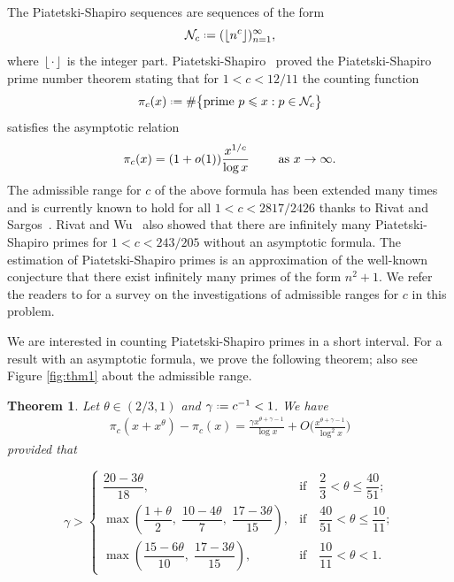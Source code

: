 \documentclass[12pt, reqno, twoside, letterpaper]{amsart}
\numberwithin{equation}{section}
\def\fl#1{\left\lfloor#1\right\rfloor}
\newcommand{\cN}{\ensuremath{\mathcal{N}}}
\theoremstyle{customthm}
\newtheorem{theorem}[X]{Theorem}
\theoremstyle{customrem}
\renewcommand{\le}{\ensuremath{\leqslant}}
\def\fl#1{\left\lfloor#1\right\rfloor}
\newcommand*{\defeq}{\mathrel{\vcenter{\baselineskip0.5ex \lineskiplimit0pt
			\hbox{\scriptsize.}\hbox{\scriptsize.}}}%
	=}
\begin{document}
The Piatetski-Shapiro sequences are sequences of the form
$$
\cN_c \defeq (\lfloor n^{c} \rfloor)_{n=1}^\infty,
$$
where $\fl{\cdot}$ is the integer part. Piatetski-Shapiro~\cite{PS} proved the Piatetski-Shapiro prime number theorem stating that for $ 1 < c < 12/11$ the counting function
$$
\pi_c(x) \defeq \# \big\{\text{\rm prime~} p\le x : p \in \cN_{c} \big\}
$$
satisfies the asymptotic relation
\begin{equation*}
	\pi_c(x) = (1 + o(1)) \frac{x^{1/c}}{\log x} \qquad \text{~\rm as } x \to \infty.
\end{equation*}
The admissible range for $c$ of the above formula has been extended many times and is currently known to hold for all $1 < c < 2817/2426$ thanks to Rivat and Sargos~\cite{RiSa}. Rivat and Wu~\cite{RiWu} also showed that there are infinitely many Piatetski-Shapiro primes for $1 < c < 243/205$ without an asymptotic formula. The estimation of Piatetski-Shapiro primes is an approximation of the well-known conjecture that there exist infinitely many primes of the form $n^2+1$. We refer the readers to \cite{GGL} for a survey on the investigations of admissible ranges for $c$ in this problem. 

We are interested in counting Piatetski-Shapiro primes in a short interval. For a result with an asymptotic formula, we prove the following theorem; also see Figure \ref{fig:thm1} about the admissible range. 

\begin{theorem}\label{thm1}
	Let $\theta \in (2/3,1)$ and $\gamma \defeq c^{-1}<1$. We have
\begin{align*}
\pi_{c}(x+x^{\theta}) - \pi_{c}(x) = \frac{\gamma x^{\theta+\gamma-1}}{\log x} + O\Big(\frac{x^{\theta+\gamma-1}}{\log^2 x}\Big)
\end{align*}
provided that 

\begin{equation}\label{eq:thm1}
\gamma > 
\begin{cases}
	\dfrac{20-3\theta}{18}, & \text{if} \quad \dfrac{2}{3} < \theta \le \dfrac{40}{51}; \\[1em]
	\max \left( \dfrac{1+\theta}{2},\; \dfrac{10-4\theta}{7},\; \dfrac{17-3\theta}{15} \right), & \text{if} \quad \dfrac{40}{51} < \theta \le \dfrac{10}{11}; \\[1em]
	\max \left( \dfrac{15-6\theta}{10},\; \dfrac{17-3\theta}{15} \right), & \text{if} \quad \dfrac{10}{11} < \theta < 1.
\end{cases}
\end{equation}

\end{theorem}	
\end{document}
